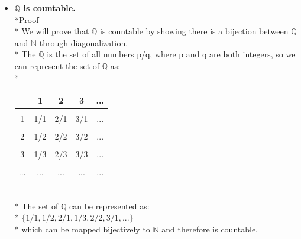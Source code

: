 \documentclass[12pt]{article}
\begin{document}
\begin{itemize}
\item \textbf{$\mathbb{Q}$ is countable. }
\bigskip
\\*\uline{Proof}
\bigskip
\\* We will prove that $\mathbb{Q}$ is countable by showing there is a bijection between $\mathbb{Q}$ and $\mathbb{N}$ through diagonalization.
\bigskip
\\* The $\mathbb{Q}$ is the set of all numbers p/q, where p and q are both integers, so we can represent the set of $\mathbb{Q}$ as:
\\*\begin{tabular}{c|cccc}
\\* & 1 & 2 & 3 & ... \\
\hline
\\* 1 & 1/1 & 2/1 & 3/1 & ...\\
\\* 2 & 1/2 & 2/2 & 3/2 & ...\\
\\* 3 & 1/3 & 2/3 & 3/3 & ...\\
\\* ... & ... & ... & ... & ... 
\end{tabular}
\bigskip
\\* The set of $\mathbb{Q}$ can be represented as:
\\* $\{ 1/1, 1/2, 2/1, 1/3, 2/2, 3/1,...\}$
\\* which can be mapped bijectively to $\mathbb{N}$ and therefore is countable.
\end{itemize}
\bigskip
\end{document}
